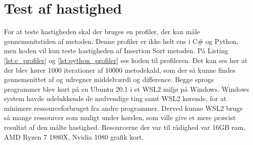 \documentclass[class=report, crop=false]{standalone}
\begin{document}
    \section{Test af hastighed}
    For at teste hastigheden skal der bruges en profiler, der kan måle gennemsnitstiden af metoden. Denne profiler er ikke helt ens i C\# og Python, men koden vil kun teste hastigheden af Insertion Sort metoden. På Listing \ref{lst:c_profiler} og \ref{lst:python_profiler} ses koden til profileren. Det kan ses her at der blev kører 1000 iterationer af 10000 metodekald, som der så kunne findes gennemsnittet af og udregner middelværdi og difference.
    Begge sprogs programmer blev kørt på en Ubuntu 20.1 i et WSL2 miljø på Windows. Windows system havde udelukkende de nødvendige ting samt WSL2 kørende, for at minimere ressourceforbruget fra andre programmer. Derved kunne WSL2 bruge så mange ressourcer som muligt under kørslen, som ville give et mere præcist resultat af den målte hastighed. Resourcerne der var til rådighed var 16GB ram, AMD Ryzen 7 1880X, Nvidia 1080 grafik kort.
    \begin{tcolorbox}
        \lstset{style=codestyle}
        C}, lastline=22, caption={C\# Profiler}, label={lst:c_profiler}]{Kode/Profiler.cs}
    \end{tcolorbox}
    \begin{tcolorbox}
        \lstset{style=codestyle}
        
    \end{tcolorbox}
\end{document}
